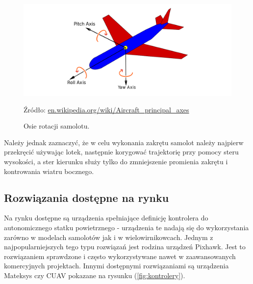 \documentclass[12pt, a4paper]{article}
\let\oldref\ref
\renewcommand{\ref}[1]{(\oldref{#1})}
\begin{document}
\begin{figure}[ht]
    \centering
    \includegraphics[width=1\textwidth]{osie}
    \caption{Osie rotacji samolotu.}
    \small Źródło: \url{en.wikipedia.org/wiki/Aircraft_principal_axes}
    \label{fig:osie}
\end{figure}

Należy jednak zaznaczyć, że w celu wykonania zakrętu samolot należy najpierw przekręcić używając lotek, następnie korygować trajektorię przy pomocy steru wysokości, a ster kierunku służy tylko do zmniejszenie promienia zakrętu i kontrowania wiatru bocznego.

\FloatBarrier
 
\subsection{Rozwiązania dostępne na rynku}
Na rynku dostępne są urządzenia spełniające definicję kontrolera do autonomicznego statku powietrznego - urządzenia te nadają się do wykorzystania zarówno w modelach samolotów jak i w wielowirnikowcach. Jednym z najpopularniejszych tego typu rozwiązań jest rodzina urządzeń Pixhawk. Jest to rozwiązaniem sprawdzone i często wykorzystywane nawet w zaawansowanych komercyjnych projektach. Innymi dostępnymi rozwiązaniami są urządzenia Mateksys czy CUAV pokazane na rysunku \ref{fig:kontrolery}.
\end{document}
